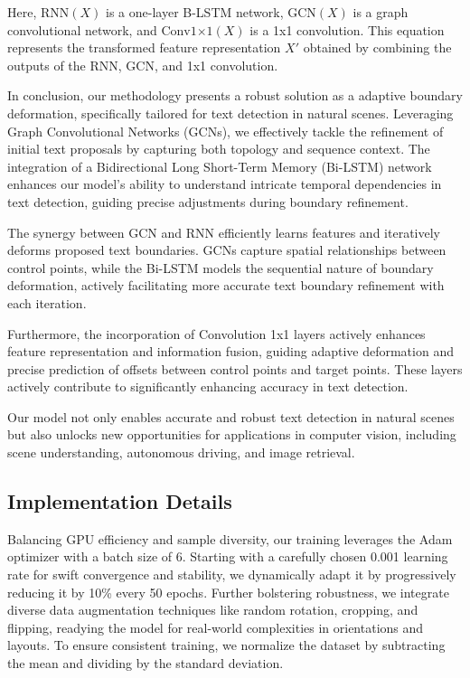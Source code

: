 \documentclass[default,iicol]{sn-jnl} %
\begin{document}
Here, $\text{{RNN}}(X)$ is a one-layer B-LSTM network, $\text{{GCN}}(X)$ is a graph convolutional network, and $\text{{Conv1×1}}(X)$ is a 1x1 convolution. This equation represents the transformed feature representation $X'$ obtained by combining the outputs of the RNN, GCN, and 1x1 convolution.

In conclusion, our methodology presents a robust solution as a adaptive boundary deformation, specifically tailored for text detection in natural scenes. Leveraging Graph Convolutional Networks (GCNs), we effectively tackle the refinement of initial text proposals by capturing both topology and sequence context. The integration of a Bidirectional Long Short-Term Memory (Bi-LSTM) network enhances our model's ability to understand intricate temporal dependencies in text detection, guiding precise adjustments during boundary refinement.

The synergy between GCN and RNN efficiently learns features and iteratively deforms proposed text boundaries. GCNs capture spatial relationships between control points, while the Bi-LSTM models the sequential nature of boundary deformation, actively facilitating more accurate text boundary refinement with each iteration.

Furthermore, the incorporation of Convolution 1x1 layers actively enhances feature representation and information fusion, guiding adaptive deformation and precise prediction of offsets between control points and target points. These layers actively contribute to significantly enhancing accuracy in text detection.

Our model not only enables accurate and robust text detection in natural scenes but also unlocks new opportunities for applications in computer vision, including scene understanding, autonomous driving, and image retrieval.

\subsection{Implementation Details}
Balancing GPU efficiency and sample diversity, our training leverages the Adam optimizer with a batch size of 6. Starting with a carefully chosen 0.001 learning rate for swift convergence and stability, we dynamically adapt it by progressively reducing it by 10\% every 50 epochs. Further bolstering robustness, we integrate diverse data augmentation techniques like random rotation, cropping, and flipping, readying the model for real-world complexities in orientations and layouts. To ensure consistent training, we normalize the dataset by subtracting the mean and dividing by the standard deviation.
\end{document}
